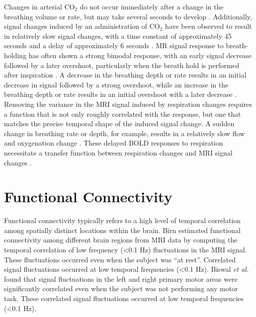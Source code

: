 \documentclass[twoside,twocolumn]{article}
\begin{document}
Changes in arterial CO$_2$ do not occur immediately after a change in the breathing volume or rate, but may take several seconds to develop \cite{VandenAardweg2002}. Additionally, signal changes induced by an administration of CO$_2$ have been observed to result in relatively slow signal changes, with a time constant of approximately 45 seconds and a delay of approximately 6 seconds \cite{Poulin1996}\cite{Corfield2001}.  MR signal response to breath-holding has often shown a strong bimodal response, with an early signal decrease followed by a later overshoot, particularly when the breath hold is performed after inspiration \cite{Birn2008}.  A decrease in the breathing depth or rate results in an initial decrease in signal followed by a strong overshoot, while an increase in the breathing depth or rate results in an initial overshoot with a later decrease \cite{Birn2008}.  Removing the variance in the MRI signal induced by respiration changes requires a function that is not only roughly correlated with the response, but one that matches the precise temporal shape of the induced signal change. A sudden change in breathing rate or depth, for example, results in a relatively slow flow and oxygenation change \cite{Birn2008}.   These delayed BOLD responses to respiration necessitate a transfer function between respiration changes and MRI signal changes \cite{Birn2008}.

\section{Functional Connectivity}

Functional connectivity typically refers to a high level of temporal correlation among spatially distinct locations within the brain.  Birn \cite{Birn2012} estimated functional connectivity among different brain regions from MRI data by computing the temporal correlation of low frequency (<0.1 Hz) ﬂuctuations in the MRI signal.  These fluctuations occurred even when the subject was ``at rest''.  Correlated signal ﬂuctuations occurred at low temporal frequencies (<0.1 Hz).  Biswal {\em et al.}\cite{Biswal1995} found that signal ﬂuctuations in the left and right primary motor areas were signiﬁcantly correlated even when the subject was not performing any motor task.  These correlated signal ﬂuctuations occurred at low temporal frequencies (<0.1 Hz)\cite{Birn2012}.
\end{document}
